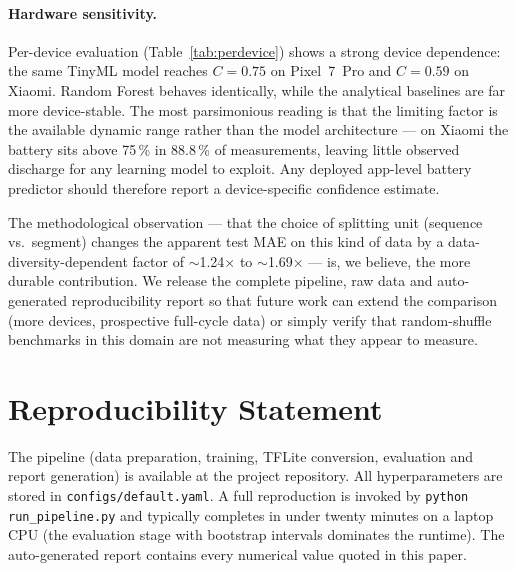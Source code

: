 \documentclass[conference]{IEEEtran}
\begin{document}
\paragraph{Hardware sensitivity.}
Per-device evaluation (Table~\ref{tab:perdevice}) shows a strong
device dependence: the same TinyML model reaches $C{=}0.75$ on
Pixel~7~Pro and $C{=}0.59$ on Xiaomi. Random Forest behaves
identically, while the analytical baselines are far more
device-stable. The most parsimonious reading is that the limiting
factor is the available dynamic range rather than the model
architecture --- on Xiaomi the battery sits above 75\,\% in
88.8\,\% of measurements, leaving little observed discharge for any
learning model to exploit. Any deployed app-level battery predictor
should therefore report a device-specific confidence estimate.

The methodological observation --- that the choice of splitting unit
(sequence vs.\ segment) changes the apparent test MAE on this kind of
data by a data-diversity-dependent factor of $\sim$1.24$\times$ to
$\sim$1.69$\times$ --- is, we believe, the more durable contribution.
We release the complete pipeline, raw data and auto-generated
reproducibility report so that future work can extend the comparison
(more devices, prospective full-cycle data) or simply verify that
random-shuffle benchmarks in this domain are not measuring what they
appear to measure.

\section*{Reproducibility Statement}
The pipeline (data preparation, training, TFLite conversion, evaluation
and report generation) is available at the project repository. All
hyperparameters are stored in \texttt{configs/default.yaml}. A full
reproduction is invoked by \texttt{python run\_pipeline.py} and
typically completes in under twenty minutes on a laptop CPU
(the evaluation stage with bootstrap intervals dominates the
runtime). The auto-generated report contains every numerical value
quoted in this paper.



\end{document}
